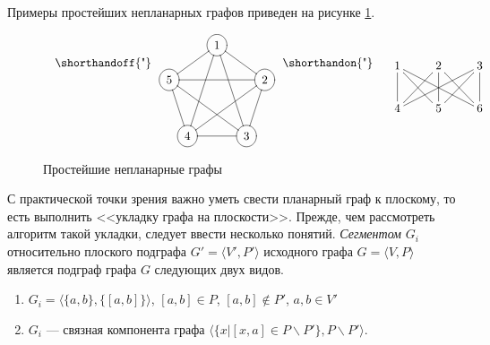Примеры простейших непланарных графов приведен на рисунке \ref{fig:graph:simplestNonPlanar}.
\begin{figure}
    \[
        \begin{tabular}{cc}
            {
                \shorthandoff{"}
                \raisebox{-0.5\height}{
                    \(
                        \begin{xy}
                            \POS (0.00,15.00)*++[o][F-]{1}="a1"
                            \POS (14.27,4.64)*++[o][F-]{2}="b1"
                            \POS (8.82,-12.14)*++[o][F-]{3}="c1"
                            \POS (-8.82,-12.14)*++[o][F-]{4}="d1"
                            \POS (-14.27,4.64)*++[o][F-]{5}="e1"
                            \POS"a1" \ar @{-} "b1"
                            \POS"a1" \ar @{-} "c1"
                            \POS"a1" \ar @{-} "d1"
                            \POS"a1" \ar @{-} "e1"
                            \POS"b1" \ar @{-} "c1"
                            \POS"b1" \ar @{-} "d1"
                            \POS"b1" \ar @{-} "e1"
                            \POS"c1" \ar @{-} "d1"
                            \POS"c1" \ar @{-} "e1"
                            \POS"d1" \ar @{-} "e1"
                        \end{xy}        
                    \) 
                }
                \shorthandon{"}            
            }
            &
            {\xymatrix{
                {1} \ar@{-}[d] \ar@{-}[dr] \ar@{-}[drr]
                    &{2} \ar@{-}[dl] \ar@{-}[d] \ar@{-}[dr]
                        &{3} \ar@{-}[dll] \ar@{-}[dl] \ar@{-}[d]
                             \\
                {4}
                    &{5}
                        &{6}
            }}
        \end{tabular}
    \]
    \caption{Простейшие непланарные графы}
    \label{fig:graph:simplestNonPlanar}
\end{figure}

С практической точки зрения важно уметь свести планарный граф к плоскому, то есть выполнить <<укладку графа на плоскости>>. Прежде, чем рассмотреть алгоритм такой укладки, следует ввести несколько понятий. \emph{Сегментом} $G_i$ относительно плоского подграфа $G'=\langle V',P'\rangle$ исходного графа $G=\langle V,P\rangle$ является подграф графа $G$ следующих двух видов.
\begin{enumerate}
    \item $G_i=\langle\{a,b\},\{[a,b]\}\rangle$, $[a,b]\in P$, $[a,b]\not\in P'$, $a,b\in V'$
    \item $G_i$ --- связная компонента графа $\langle\{x|[x,a]\in P\backslash P'\},P\backslash P'\rangle$.
\end{enumerate}

